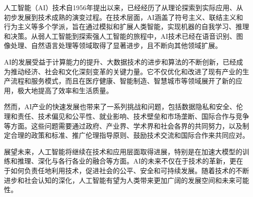 人工智能（AI）技术自1956年提出以来，已经经历了从理论探索到实际应用、从初步发展到技术成熟的演变过程。在技术层面，AI涵盖了符号主义、联结主义和行为主义等多个学派，旨在通过模拟和扩展人类智能，实现机器的自我学习、推理和决策。从弱人工智能到探索强人工智能的旅程中，AI技术已经在语音识别、图像处理、自然语言处理等领域取得了显著进步，且不断向其他领域扩展。

AI的发展受益于计算能力的提升、大数据技术的进步和算法的不断创新，已经成为推动经济、社会和文化深刻变革的关键力量。它不仅优化和改进了现有产业的生产流程和服务模式，而且在医疗健康、智能制造、智慧城市等领域展开了新的应用，极大地提高了效率和生活质量。

然而，AI产业的快速发展也带来了一系列挑战和问题，包括数据隐私和安全、伦理和责任、技术偏见和公平性、就业影响、技术壁垒和市场垄断、国际合作与竞争等方面。这些问题需要通过政府、产业界、学术界和社会各界的共同努力，以及制定合理的政策和标准、推广伦理指导原则、鼓励技术交流和国际合作来共同应对。

展望未来，人工智能将继续在技术和应用层面取得进展，特别是在加速大模型的训练和推理、深化与各行各业的融合等方面。AI的未来不仅在于技术的革新，更在于如何负责任地利用技术，促进社会的公平、安全和可持续发展。随着技术的不断进步和社会认知的深化，人工智能有望为人类带来更加广阔的发展空间和未来可能性。
